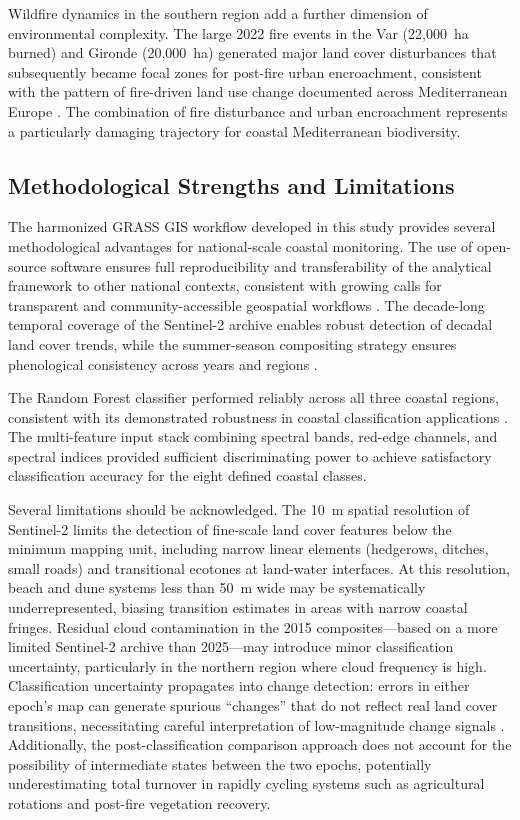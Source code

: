 \documentclass[remotesensing,article,submit,pdftex,moreauthors]{Definitions/mdpi}
\begin{document}
Wildfire dynamics in the southern region add a further dimension of environmental complexity. The large 2022 fire events in the Var (22,000~ha burned) and Gironde (20,000~ha) generated major land cover disturbances that subsequently became focal zones for post-fire urban encroachment, consistent with the pattern of fire-driven land use change documented across Mediterranean Europe \citep{IPCC2022med}. The combination of fire disturbance and urban encroachment represents a particularly damaging trajectory for coastal Mediterranean biodiversity.

\subsection{Methodological Strengths and Limitations}

The harmonized GRASS GIS workflow developed in this study provides several methodological advantages for national-scale coastal monitoring. The use of open-source software ensures full reproducibility and transferability of the analytical framework to other national contexts, consistent with growing calls for transparent and community-accessible geospatial workflows \citep{Neteler2012, Gatis2022, Rocchini2016, Lemenkova2023GRASS}. The decade-long temporal coverage of the Sentinel-2 archive enables robust detection of decadal land cover trends, while the summer-season compositing strategy ensures phenological consistency across years and regions \citep{RF_Czechia2022, Drusch2012}.

The Random Forest classifier performed reliably across all three coastal regions, consistent with its demonstrated robustness in coastal classification applications \citep{Yancheng2024, VegPortugal2022}. The multi-feature input stack combining spectral bands, red-edge channels, and spectral indices provided sufficient discriminating power to achieve satisfactory classification accuracy for the eight defined coastal classes.

Several limitations should be acknowledged. The 10~m spatial resolution of Sentinel-2 limits the detection of fine-scale land cover features below the minimum mapping unit, including narrow linear elements (hedgerows, ditches, small roads) and transitional ecotones at land-water interfaces. At this resolution, beach and dune systems less than 50~m wide may be systematically underrepresented, biasing transition estimates in areas with narrow coastal fringes. Residual cloud contamination in the 2015 composites—based on a more limited Sentinel-2 archive than 2025—may introduce minor classification uncertainty, particularly in the northern region where cloud frequency is high. Classification uncertainty propagates into change detection: errors in either epoch's map can generate spurious ``changes'' that do not reflect real land cover transitions, necessitating careful interpretation of low-magnitude change signals \citep{Liu2023, Gatis2022}. Additionally, the post-classification comparison approach does not account for the possibility of intermediate states between the two epochs, potentially underestimating total turnover in rapidly cycling systems such as agricultural rotations and post-fire vegetation recovery.
\end{document}
